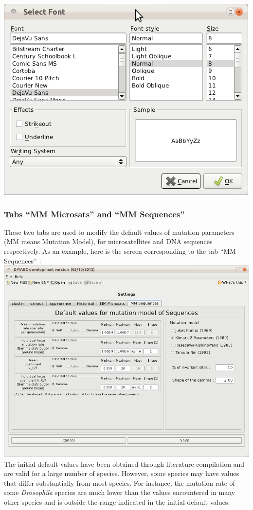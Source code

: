 \includegraphics[scale=0.33]{gui_pictures/Capture-DIYABC-101.png} \\


\subsubsection{Tabs \textsf{``MM Microsats''} and \textsf{``MM Sequences''}}

These two tabs are used to modify the default values of mutation parameters (MM means Mutation Model), for microsatellites and DNA sequences respectively. As an example, here is the screen corresponding to the tab  \textsf{``MM Sequences''} : \\

\includegraphics[scale=0.33]{gui_pictures/Capture-DIYABC-102.png} \\

The initial default values have been obtained through literature compilation and are valid for a large number of species. However, some species may have values that differ substantially from most species. For instance, the mutation rate of some \emph{Drosophila} species are much lower than the values encountered in many other species \citep{SMA1997,VPAD2000} and is outside the range indicated in the initial default values. 



 
